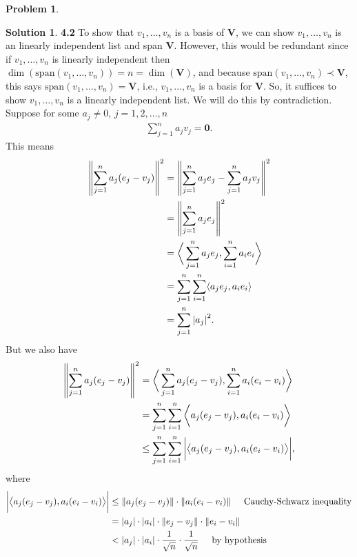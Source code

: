 \documentclass{article}
\theoremstyle{definition}
\newtheorem*{prob*}{Problem}
\newtheorem*{sln*}{Solution}
\newcommand{\V}{\mathbf{V}}
\newcommand{\xpan}{\text{span}}
\newcommand{\la}{\langle}
\newcommand{\ra}{\rangle}
\begin{document}
\begin{prob*}
\begin{enumerate}
		\begin{sln*}\textbf{4.2}
			To show that $v_1,\dots,v_n$ is a basis of $\V$, we can show $v_1,\dots,v_n$ is an linearly independent list and span $\V$. However, this would be redundant since if $v_1,\dots,v_n$ is linearly independent then $\dim(\xpan(v_1,\dots,v_n)) = n = \dim(\V)$, and because $\xpan(v_1,\dots,v_n) \prec \V$, this says $\xpan(v_1,\dots,v_n) = \V$, i.e., $v_1,\dots,v_n$ is a basis for $\V$. So, it suffices to show $v_1,\dots,v_n$ is a linearly independent list. We will do this by contradiction. \\
			
			Suppose for some $a_j \neq 0$, $j=1,2,\dots,n$
			\begin{align*}
			\sum^n_{j=1}a_j v_j = \mathbf{0}.
			\end{align*}
			This means
			\begin{align*}
			\norm{\sum^n_{j=1} a_j(e_j - v_j)}^2 
			&= \norm{ \sum^n_{j=1}	a_j e_j - \sum^n_{j=1}a_jv_j }^2 \\
			&= \norm{\sum^n_{j=1}a_je_j}^2 \\
			&= \bigg\la \sum^n_{j=1}a_je_j, \sum^n_{i=1}a_ie_i \bigg\ra  \\
			&= \sum^n_{j=1}\sum^n_{i=1}\la a_j e_j , a_ie_i \ra\\
			&= \sum^n_{j=1}\abs{a_j}^2.
			\end{align*}
			But we also have
			\begin{align*}
			\norm{\sum^n_{j=1} a_j(e_j - v_j)}^2 
			&= \bigg\la    \sum^n_{j=1}a_j(e_j - v_j) , \sum^n_{i=1}a_i(e_i - v_i)\bigg\ra\\
			&= \sum^n_{j=1}\sum^n_{i=1}\bigg\la  a_j(e_j - v_j) , a_i(e_i - v_i)\bigg\ra\\
			&\leq \sum^n_{j=1}\sum^n_{i=1} \bigg\vert \big\la a_j(e_j - v_j), a_i(e_i - v_i) \big\ra \bigg\vert,
			\end{align*}
			where 
			\begin{align*}
			\bigg\vert \big\la a_j(e_j - v_j), a_i(e_i - v_i) \big\ra \bigg\vert 
			&\leq \norm{a_j(e_j - v_j)} \cdot \norm{a_i(e_i - v_i)} \hspace{0.5cm} \text{Cauchy-Schwarz inequality} \\
			&= \abs{a_j}\cdot \abs{a_i} \cdot \norm{e_j - v_j}\cdot \norm{e_i - v_i}\\
			&< \abs{a_j}\cdot \abs{a_i}\cdot \frac{1}{\sqrt{n}} \cdot \frac{1}{\sqrt{n}} \hspace{0.5cm}\text{by hypothesis}\\

\end{align*}
\end{sln*}
\end{enumerate}
\end{prob*}
\end{document}

